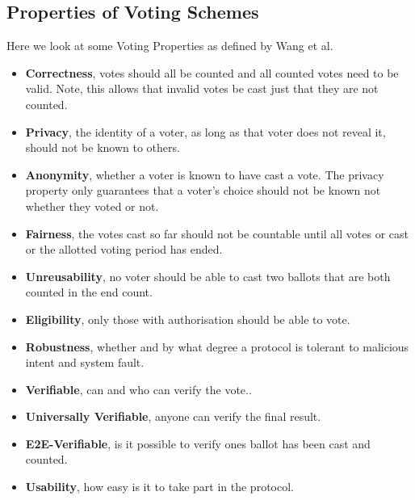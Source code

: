 \documentclass{llncs}
\begin{document}
\subsection{Properties of Voting Schemes}
Here we look at some Voting Properties as defined by Wang et al. \cite{RequirementOfEVoting}
\begin{itemize}
  \item {\bfseries Correctness}, votes should all be counted and all counted votes need to be valid. Note, this allows that invalid votes be cast just that they are not counted.
  \item {\bfseries Privacy}, the identity of a voter, as long as that voter does not reveal it, should not be known to others.
  \item {\bfseries Anonymity}, whether a voter is known to have cast a vote. The privacy property only guarantees that a voter's choice should not be known not whether they voted or not.
  \item {\bfseries Fairness}, the votes cast so far should not be countable until all votes or cast or the allotted voting period has ended.
  \item {\bfseries Unreusability}, no voter should be able to cast two ballots that are both counted in the end count.
  \item {\bfseries Eligibility}, only those with authorisation should be able to vote.
  \item {\bfseries Robustness}, whether and by what degree a protocol is tolerant to malicious intent and system fault.
  \item {\bfseries Verifiable}, can and who can verify the vote..
  \item {\bfseries Universally Verifiable}, anyone can verify the final result. 
  \item {\bfseries E2E-Verifiable}, is it possible to verify ones ballot has been cast and counted.
  \item {\bfseries Usability}, how easy is it to take part in the protocol.
\end{itemize}
\end{document}
